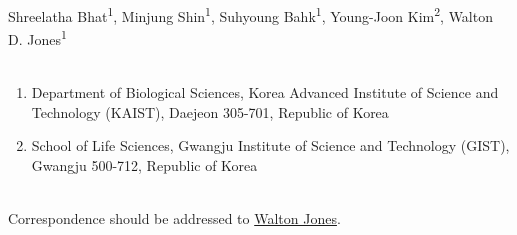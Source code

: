 Shreelatha Bhat\textsuperscript{1}, Minjung Shin\textsuperscript{1}, Suhyoung Bahk\textsuperscript{1}, Young-Joon Kim\textsuperscript{2}, Walton D. Jones\textsuperscript{1}
\\
\\
\begin{enumerate}
\item Department of Biological Sciences, Korea Advanced Institute of Science and Technology (KAIST), Daejeon 305-701, Republic of Korea
\item School of Life Sciences, Gwangju Institute of Science and Technology (GIST), Gwangju 500-712, Republic of Korea
\end{enumerate}
\\
Correspondence should be addressed to \href{waltonjones@kaist.edu}{Walton Jones}.